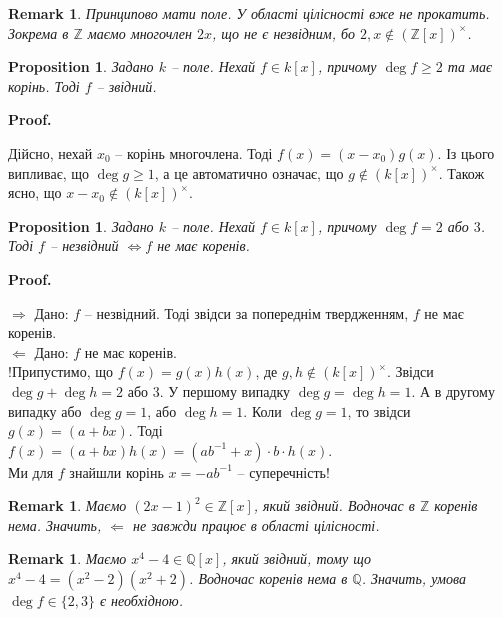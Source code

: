 \documentclass[a4paper, 10pt]{article}
\makeatletter
\def\rightproof{$\boxed{\Rightarrow}$ }
\def\leftproof{$\boxed{\Leftarrow}$ }
\theoremstyle{theoremdd}
\theoremstyle{theoremdd}
\theoremstyle{theoremdd}
\theoremstyle{theoremdd}
\theoremstyle{theoremdd}
\theoremstyle{theoremdd}
\theoremstyle{theoremdd}
\theoremstyle{theoremdd}
\theoremstyle{theoremdd}
\newtheorem{proposition}[theorem]{Proposition}
\theoremstyle{theoremdd}
\theoremstyle{theoremdd}
\newtheorem{remark}[theorem]{Remark}
\theoremstyle{theoremdd}
\theoremstyle{theoremdd}
\theoremstyle{theoremdd}
\theoremstyle{theoremdd}
\renewenvironment{proof}[1][Proof.\\]{\par
\pushQED{\hfill \qed}%
\normalfont \topsep6\p@\@plus6\p@\relax
\trivlist
\item\relax
{\bfseries
#1\@addpunct{.}}\hspace\labelsep\ignorespaces
}{%
\popQED\endtrivlist\@endpefalse
}
\makeatother
\begin{document}
\begin{remark}
Принципово мати поле. У області цілісності вже не прокатить. Зокрема в $\mathbb{Z}$ маємо многочлен $2x$, що не є незвідним, бо $2, x \notin (\mathbb{Z}[x])^\times$.
\end{remark}

\begin{proposition}
\label{degree_at_least_two_have_roots_then_reducible}
Задано $k$ -- поле. Нехай $f \in k[x]$, причому $\deg f \geq 2$ та має корінь. Тоді $f$ -- звідний.
\end{proposition}

\begin{proof}
Дійсно, нехай $x_0$ -- корінь многочлена. Тоді $f(x) = (x-x_0)g(x)$. Із цього випливає, що $\deg g \geq 1$, а це автоматично означає, що $g \notin (k[x])^\times$. Також ясно, що $x-x_0 \notin (k[x])^\times$.
\end{proof}

\begin{proposition}
\label{deg_two_or_three_polynomial_af_field_no_roots}
Задано $k$ -- поле. Нехай $f \in k[x]$, причому $\deg f = 2$ або $3$. Тоді $f$ -- незвідний $\iff f$ не має коренів.
\end{proposition}

\begin{proof}
\rightproof Дано: $f$ -- незвідний. Тоді звідси за попереднім твердженням, $f$ не має коренів.
\bigskip \\
\leftproof Дано: $f$ не має коренів.\\
!Припустимо, що $f(x) = g(x)h(x)$, де $g,h \notin (k[x])^\times$. Звідси $\deg g + \deg h = 2$ або $3$. У першому випадку $\deg g = \deg h = 1$. А в другому випадку або $\deg g = 1$, або $\deg h = 1$. Коли $\deg g = 1$, то звідси $g(x) = (a + bx)$. Тоді\\
$f(x) = (a + bx)h(x) = (ab^{-1}+x) \cdot b \cdot h(x)$.\\
Ми для $f$ знайшли корінь $x = -ab^{-1}$ -- суперечність!
\end{proof}

\begin{remark}
Маємо $(2x-1)^2 \in \mathbb{Z}[x]$, який звідний. Водночас в $\mathbb{Z}$ коренів нема. Значить, \leftproof не завжди працює в області цілісності.
\end{remark}

\begin{remark}
Маємо $x^4 - 4 \in \mathbb{Q}[x]$, який звідний, тому що $x^4 - 4 = (x^2 - 2)(x^2 +2)$. Водночас коренів нема в $\mathbb{Q}$. Значить, умова $\deg f \in \{2,3\}$ є необхідною.
\end{remark}
\end{document}
